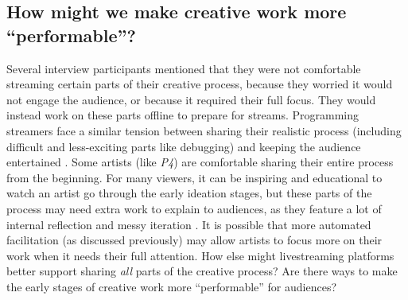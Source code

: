 

\subsection{How might we make creative work more ``performable''?}
Several interview participants mentioned that they were not comfortable streaming certain parts of their creative process, because they worried it would not engage the audience, or because it required their full focus. They would instead work on these parts offline to prepare for streams. Programming streamers face a similar tension between sharing their realistic process (including difficult and less-exciting parts like debugging) and keeping the audience entertained \cite{Faas2018}. Some artists (like \textit{P4}) are comfortable sharing their entire process from the beginning. For many viewers, it can be inspiring and educational to watch an artist go through the early ideation stages, but these parts of the process may need extra work to explain to audiences,
as they feature a lot of internal reflection and messy iteration \cite{Schon1983}. It is possible that more automated facilitation (as discussed previously) may allow artists to focus more on their work when it needs their full attention. How else might livestreaming platforms better support sharing \textit{all} parts of the creative process? Are there ways to make the early stages of creative work more ``performable'' for audiences? 

